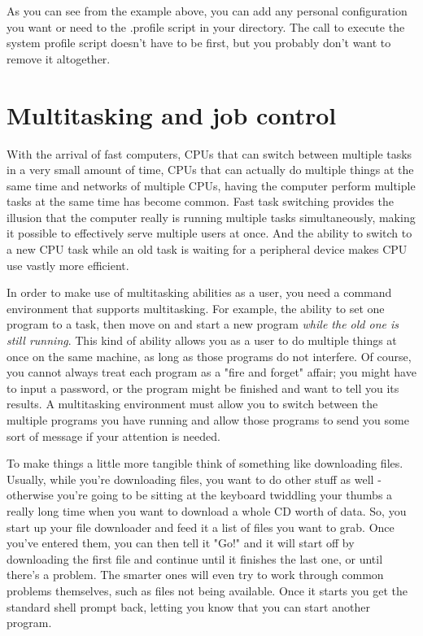 As you can see from the example above, you can add any personal configuration
you want or need to the .profile script in your directory. The call to execute
the system profile script doesn't have to be first, but you probably don't want
to remove it altogether.

\section{Multitasking and job control}
With the arrival of fast computers, CPUs that can switch between multiple tasks
in a very small amount of time, CPUs that can actually do multiple things at
the same time and networks of multiple CPUs, having the computer perform
multiple tasks at the same time has become common. Fast task switching provides
the illusion that the computer really is running multiple tasks simultaneously,
making it possible to effectively serve multiple users at once. And the ability
to switch to a new CPU task while an old task is waiting for a peripheral
device makes CPU use vastly more efficient.

In order to make use of multitasking abilities as a user, you need a command
environment that supports multitasking. For example, the ability to set one
program to a task, then move on and start a new program \textit{while the old
one is still running}. This kind of ability allows you as a user to do multiple
things at once on the same machine, as long as those programs do not interfere.
Of course, you cannot always treat each program as a "fire and forget" affair;
you might have to input a password, or the program might be finished and want
to tell you its results. A multitasking environment must allow you to switch
between the multiple programs you have running and allow those programs to send
you some sort of message if your attention is needed.

To make things a little more tangible think of something like downloading
files. Usually, while you're downloading files, you want to do other stuff as
well - otherwise you're going to be sitting at the keyboard twiddling your
thumbs a really long time when you want to download a whole CD worth of data.
So, you start up your file downloader and feed it a list of files you want to
grab. Once you've entered them, you can then tell it "Go!" and it will start
off by downloading the first file and continue until it finishes the last one,
or until there's a problem. The smarter ones will even try to work through
common problems themselves, such as files not being available. Once it starts
you get the standard shell prompt back, letting you know that you can start
another program. 

